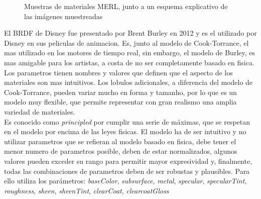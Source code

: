 \begin{figure}[H]
    \vspace{0.5cm}
    \centering
    \caption{Muestras de materiales MERL, junto a un esquema explicativo de las im\'agenes muestreadas}
    \vspace{0.5cm}
\end{figure}

El BRDF de Disney fue presentado por Brent Burley en 2012 y es el utilizado por Disney en sus peliculas de animacion. Es,
junto al modelo de Cook-Torrance, el mas utilizado en los motores de tiempo real, sin embargo, el modelo de Burley, es mas
amigable para los artistas, a costa de no ser completamente basado en fisica. Los parametros tienen nombres y valores que
definen que el aspecto de los materiales son mas intuitivos. Los lobulos adicionales, a diferencia del modelo de Cook-Torrance,
pueden variar mucho en forma y tamanho, por lo que es un modelo muy flexible, que permite representar con gran realismo una
amplia variedad de materiales.\\

Es conocido como \textit{principled} por cumplir una serie de m\'aximas, que se respetan en el modelo por encima de las leyes fisicas.
El modelo ha de ser intuitivo y no utilizar parametros que se refieran al modelo basado en fisica, debe tener el menor
numero de parametros posible, deben de estar normalizados, algunos valores pueden exceder su rango para permitir mayor
expresividad y, finalmente, todas las combinaciones de parametros deben de ser robustas y plausibles. Para ello utiliza los
par\'ametros: \textit{baseColor}, \textit{subsurface}, \textit{metal}, \textit{specular}, \textit{specularTint}, \textit{roughness},
\textit{sheen}, \textit{sheenTint}, \textit{clearCoat}, \textit{clearcoatGloss}

